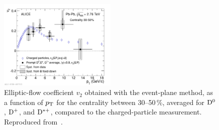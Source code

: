 \begin{figure}
\centering
\includegraphics[width=0.5\textwidth]{ksfigures/DmesonV2.pdf}
\caption{Elliptic-flow coefficient $v_2$ obtained with the event-plane method, as a function of $p_{\rm T}$ for the centrality between 30--50\,\%, averaged for ${\rm D}^0$, ${\rm D}^+$, and ${\rm D}^{*+}$, compared to the charged-particle measurement. Reproduced from~\cite{}.}
\label{figks:DmesonV2}
\end{figure}

